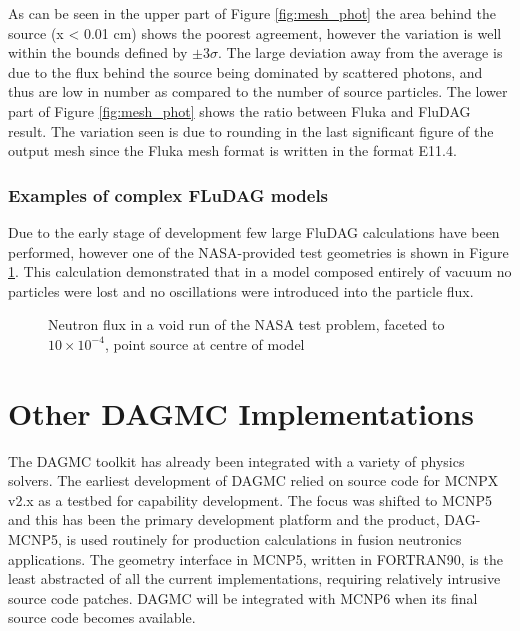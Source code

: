 \documentclass{anstrans}[12pt]
\begin{document}
As can be seen in the upper part of Figure \ref{fig:mesh_phot} the area behind the source 
(x < 0.01 cm) shows the poorest agreement, however the variation is well within the 
bounds defined by $\pm 3\sigma$. The large deviation away from the average is due to 
the flux behind the source being dominated by scattered photons, and thus are low in 
number as compared to the number of source particles.  The lower part of Figure 
\ref{fig:mesh_phot} shows the ratio between Fluka and FluDAG result. The variation seen is 
due to rounding in the last significant figure of the output mesh since the Fluka mesh format is written 
 in the format E11.4. 

\subsubsection{Examples of complex FLuDAG models}
Due to the early stage of development few large FluDAG calculations have been performed, however
one of the NASA-provided test geometries is shown in Figure \ref{nasa_mesh}.  This calculation demonstrated 
that in a model composed entirely of vacuum no particles were lost and no oscillations were
introduced into the particle flux.

\begin{figure}%
        \begin{center}
                \caption{Neutron flux in a void run of the NASA test problem, 
                         faceted to $10\times10^{-4}$, point source at centre of model}\label{nasa_mesh}
        \end{center}
\end{figure}

\section{Other DAGMC Implementations}

The DAGMC toolkit has already been integrated with a variety of
physics solvers.  The earliest development of DAGMC relied on source
code for MCNPX v2.x as a testbed for capability development.  The focus
was shifted to MCNP5 and this has been the primary development
platform and the product, DAG-MCNP5, is used routinely for production
calculations in fusion neutronics applications.  The geometry
interface in MCNP5, written in FORTRAN90, is the least abstracted of
all the current implementations, requiring relatively intrusive source
code patches.  DAGMC will be integrated with MCNP6 when its final source
code becomes available.
\end{document}
